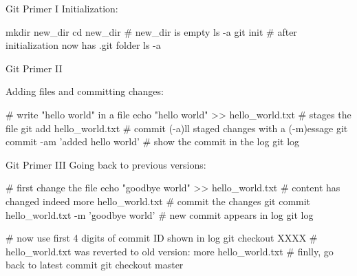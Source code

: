 
\begin{frame}[fragile]{Git Primer I}
  \vspace{0.1cm}
  Initialization:
  \vspace{0.1cm}
  \begin{mlineshell}
    mkdir new_dir
    cd new_dir
    # new_dir is empty
    ls -a                      
    git init      
    # after initialization now has .git folder
    ls -a
  \end{mlineshell}

\end{frame}


\begin{frame}[fragile]{Git Primer II}

  Adding files and committing changes:
  \begin{mlineshell}
    # write "hello world" in a file
    echo "hello world" >> hello_world.txt
    # stages the file 
    git add hello_world.txt
    # commit (-a)ll staged changes with a (-m)essage 
    git commit -am 'added hello world'
    # show the commit in the log
    git log
  \end{mlineshell}

\end{frame}


\begin{frame}[fragile]{Git Primer III}
  \vspace{0.2cm}
  Going back to previous versions:
  \begin{mlineshell}
    # first change the file
    echo "goodbye world" >> hello_world.txt
    # content has changed indeed 
    more hello_world.txt
    # commit the changes 
    git commit hello_world.txt -m 'goodbye world'
    # new commit appears in log
    git log

    # now use first 4 digits of commit ID shown in log
    git checkout XXXX
    # hello_world.txt was reverted to old version:
    more hello_world.txt
    # finlly, go back to latest commit
    git checkout master
  \end{mlineshell}

\end{frame}


